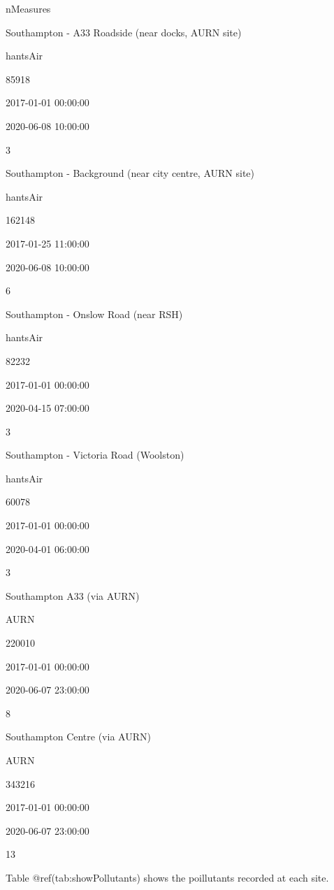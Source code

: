 \documentclass[]{article}
\newenvironment{Shaded}{\begin{snugshade}}{\end{snugshade}}
\newcommand{\KeywordTok}[1]{\textcolor[rgb]{0.13,0.29,0.53}{\textbf{#1}}}
\newcommand{\DataTypeTok}[1]{\textcolor[rgb]{0.13,0.29,0.53}{#1}}
\newcommand{\DecValTok}[1]{\textcolor[rgb]{0.00,0.00,0.81}{#1}}
\newcommand{\StringTok}[1]{\textcolor[rgb]{0.31,0.60,0.02}{#1}}
\newcommand{\OperatorTok}[1]{\textcolor[rgb]{0.81,0.36,0.00}{\textbf{#1}}}
\newcommand{\NormalTok}[1]{#1}
\begin{document}
nMeasures

Southampton - A33 Roadside (near docks, AURN site)

hantsAir

85918

2017-01-01 00:00:00

2020-06-08 10:00:00

3

Southampton - Background (near city centre, AURN site)

hantsAir

162148

2017-01-25 11:00:00

2020-06-08 10:00:00

6

Southampton - Onslow Road (near RSH)

hantsAir

82232

2017-01-01 00:00:00

2020-04-15 07:00:00

3

Southampton - Victoria Road (Woolston)

hantsAir

60078

2017-01-01 00:00:00

2020-04-01 06:00:00

3

Southampton A33 (via AURN)

AURN

220010

2017-01-01 00:00:00

2020-06-07 23:00:00

8

Southampton Centre (via AURN)

AURN

343216

2017-01-01 00:00:00

2020-06-07 23:00:00

13

Table @ref(tab:showPollutants) shows the poillutants recorded at each
site.

\begin{Shaded}
\end{Shaded}
\end{document}
